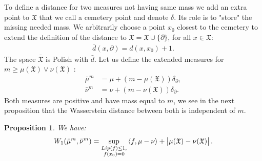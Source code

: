 \documentclass[11pt,a4paper]{article}
\newcommand{\XF}{\mathfrak{X}}
\newcommand{\brac}[1]{\left\langle#1\right\rangle}
\newtheorem{proposition}[theorem]{Proposition}
\begin{document}
To define a distance for two measures not having same mass we add an extra point to $\XF$ that we call a cemetery point and denote $\delta$. Its role is to "store" the missing needed mass. We arbitrarily choose a point $x_0$ closest to the cemetery to extend the definition of the distance to $\bar{\XF} = \XF\cup \lbrace\partial\rbrace$, for all $x \in \XF$:
\begin{align*}
    \bar{d}(x,\partial) = d(x,x_0) + 1.
\end{align*}
The space $\bar{\XF}$ is Polish with $\bar{d}$. Let us define the extended measures for $m\geq \mu(\XF) \vee \nu(\XF)$ :
\begin{align*}
    \bar{\mu}^m &= \mu + (m-\mu(\XF))\delta_{\partial}, \\
    \bar{\nu}^m &= \nu + (m-\nu(\XF))\delta_{\partial}.
\end{align*}
Both measures are positive and have mass equal to $m$, we see in the next proposition that the Wasserstein distance between both is independent of $m$.
\begin{proposition}\label{prop:Kantorovich-general}
    We have:
    \begin{align*}
        W_1(\bar{\mu}^m,\bar{\nu}^m) = \sup\limits_{\substack{Lip(f) \leq 1,\\ f(x_0) = 0}} \brac{f,\mu - \nu} + \left|\vphantom{A^2}\mu(\XF) - \nu(\XF) \right|.
    \end{align*}
\end{proposition}
\end{document}
